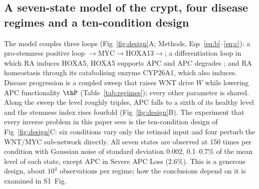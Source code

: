 \subsection{A seven-state model of the crypt, four disease regimes and a
ten-condition design}
\label{sec:res-model}

The model couples three loops (Fig~\ref{fig:design}A; Methods,
Eqs~\eqref{eq:b}--\eqref{eq:c}): a pro-stemness positive loop
\bcat{}$\to$\allowbreak MYC$\to$\allowbreak HOXA13$\to$\allowbreak\bcat{}; a differentiation loop in which RA
induces HOXA5, HOXA5 supports APC and APC degrades \bcat{}; and RA homeostasis
through its catabolising enzyme CYP26A1, which \bcat{} also induces. Disease
progression is a coupled sweep that raises WNT drive $W$ while lowering APC
functionality $\thP$ (Table~\ref{tab:regimes}); every other parameter is shared.
Along the sweep the \bcat{} level roughly triples, APC falls to a sixth of its
healthy level and the stemness index rises fourfold (Fig~\ref{fig:design}B). The
experiment that every inverse problem in this paper sees is the ten-condition
design of Fig~\ref{fig:design}C: six conditions vary only the retinoid input and
four perturb the WNT/MYC sub-network directly. All seven states are observed at
150 times per condition with Gaussian noise of standard deviation 0.002, 0.1--0.7\%
of the mean level of each state, except APC in Severe APC Loss (2.6\%).
This is a generous design, about $10^4$ observations per regime; how the
conclusions depend on it is examined in S1~Fig.

